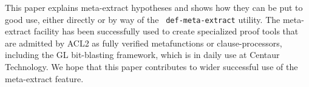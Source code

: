 







This paper explains meta-extract hypotheses and shows how they can be
put to good use, either directly or by way of the {\tt
  def-meta-extract} utility.
The meta-extract
facility has been successfully used to create specialized proof tools
that are admitted by ACL2 as fully verified metafunctions or
clause-processors, including the GL bit-blasting framework, which is
in daily use at Centaur Technology.  We hope that this paper
contributes to wider successful use of the meta-extract feature.
